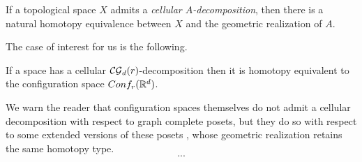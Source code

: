 \begin{proposition}
	If a topological space $X$ admits a \textit{cellular $A$-decomposition}, then there is a natural homotopy equivalence between $X$ and the geometric realization of $A$.
\end{proposition}

The case of interest for us is the following.

\begin{proposition}\label{p:berger}
	If a space has a cellular $\mathcal{CG}_d(r)$-decomposition then it is homotopy equivalent to
	the configuration space
	$Conf_{r}(\mathbb{R}^{d})$.
\end{proposition}

We warn the reader that configuration spaces themselves do not admit a cellular decomposition with respect to graph complete posets, but they do so with respect to some extended versions of these posets \cite{beuckelmann2021master}, whose geometric realization retains the same homotopy type.
\begin{equation}\label{eq:extended complete graph map}
	...
\end{equation}
